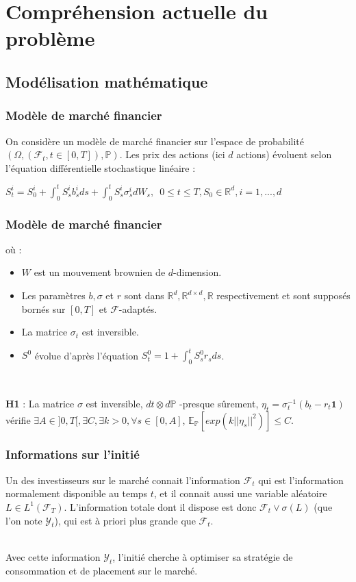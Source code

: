 \documentclass[french]{beamer}
\begin{document}
\section{Compréhension actuelle du problème}
\subsection{Modélisation mathématique}
\begin{frame}
\frametitle{Modèle de marché financier}
On considère un modèle de marché financier sur l'espace de probabilité $(\Omega, (\mathcal{F}_t, t \in [0,T]), \mathbb{P})$. Les prix des actions (ici $d$ actions) évoluent selon l'équation différentielle stochastique linéaire : 
\begin{center}
$\displaystyle S^i_t = S^i_0 + \int_{0}^{t} S^i_s b^i_s ds +  \int_{0}^{t} S^i_s \sigma^i_s dW_s,$\
$0 \leq t \leq T, S_0 \in \mathbb{R}^d, i = 1, ... , d$
\end{center}
\end{frame}
\newpage

\begin{frame}
\frametitle{Modèle de marché financier}
où : 
\begin{itemize}
\item $W$ est un mouvement brownien de $d$-dimension.
\item Les paramètres $b, \sigma$ et $r$ sont dans $\mathbb{R}^d, \mathbb{R}^{d\times d}, \mathbb{R}$ respectivement et sont supposés bornés sur $[0,T]$ et $\mathcal{F}$-adaptés.
\item La matrice $\sigma_t$ est inversible.
\item $S^0$ évolue d'après l'équation $S^0_t = 1 +\int_{0}^{t}S^0_s r_s ds$.
\end{itemize}
\

\textbf{H1} : La matrice $\sigma$ est inversible, $dt \otimes d\mathbb{P}$ -presque sûrement, $\eta_t = \sigma^{-1}_t (b_t - r_t \textbf{1})$ vérifie $\exists A \in ]0, T[, \exists C, \exists k > 0, \forall s \in [0, A]$, $\mathbb{E}_{\mathbb{P}}[exp(k||\eta_s||^2)] \leq C$.\
\end{frame}

\begin{frame}
\frametitle{Informations sur l'initié}
Un des investisseurs sur le marché connait l'information $\mathcal{F}_t$ qui est l'information normalement disponible au temps $t$, et il connait aussi une variable aléatoire $L \in L^1(\mathcal{F}_T)$. L'information totale dont il dispose est donc $\mathcal{F}_t \vee \sigma(L)$ (que l'on note $\mathcal{Y}_t$), qui est à priori plus grande que $\mathcal{F}_t$.\\
\

Avec cette information $\mathcal{Y}_t$, l'initié cherche à optimiser sa stratégie de consommation et de placement sur le marché.
\end{frame}
\end{document}
